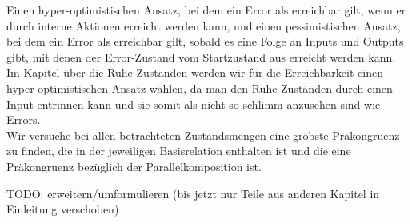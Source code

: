 Einen hyper-optimistischen Ansatz, bei dem ein Error als erreichbar gilt, wenn
er durch interne Aktionen erreicht werden kann, und einen pessimistischen
Ansatz, bei dem ein Error als erreichbar gilt, sobald es eine Folge an Inputs
und Outputs gibt, mit denen der Error-Zustand vom Startzustand aus erreicht
werden kann.\\
Im Kapitel über die Ruhe-Zuständen werden wir für die Erreichbarkeit einen
hyper-optimistischen Ansatz wählen, da man den Ruhe-Zuständen durch einen Input
entrinnen kann und sie somit als nicht so \glqq{}schlimm\grqq{} anzusehen sind
wie Errors.\\
Wir versuche bei allen betrachteten Zustandsmengen eine gröbste Präkongruenz zu
finden, die in der jeweiligen Basisrelation enthalten ist und die eine
Präkongruenz bezüglich der Parallelkomposition ist.

\scriptsize\textcolor{lgray}{TODO: erweitern/umformulieren (bis jetzt nur Teile
aus anderen Kapitel in Einleitung verschoben)}

\normalsize
